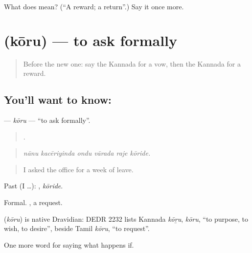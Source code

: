 \begin{tcolorbox}[breakable,colback=teal!4,colframe=teal!35!black,title={Before you move on}]
What does  mean? (\textquotedblleft{}A reward; a return\textquotedblright{}.) Say it once more.
\end{tcolorbox}
\section[\texorpdfstring{\kn{ಕೋರು} (kōru)}{ಕೋರು (kōru)}]{ (kōru) — to ask formally}

\label{lesson:KA-C416-koru}



\begin{quote}
Before the new one: say the Kannada for a vow, then the Kannada for a reward.
\end{quote}

\subsection*{You'll want to know: }
\textbf{} — \emph{kōru} — \textquotedblleft{}to ask formally\textquotedblright{}.

\begin{quote}
     .
\end{quote}

\begin{quote}
\emph{nānu kacēriyinda ondu vārada raje kōride.}
\end{quote}

\begin{quote}
I asked the office for a week of leave.
\end{quote}

Past (I …): , \emph{kōride}.

Formal. , a request.

\begin{cousinweb}
\textbf{} (\emph{kōru}) is native Dravidian: DEDR 2232 lists Kannada \emph{kōṟu}, \emph{kōru}, \textquotedblleft{}to purpose, to wish, to desire\textquotedblright{}, beside Tamil \emph{kōru}, \textquotedblleft{}to request\textquotedblright{}.
\end{cousinweb}

\begin{grammarlens}[title={What you've built}]
One more word for saying what happens if.
\end{grammarlens}

